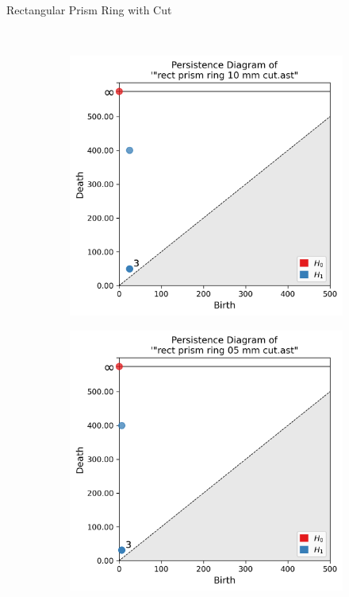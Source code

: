 \documentclass[xcolor=dvipsnames, aspectratio=169]{beamer}
\begin{document}
\begin{frame}{Rectangular Prism Ring with Cut}
\begin{figure}
\begin{subfigure}[b]{0.15\textwidth}
\end{subfigure}
\\[3pt]
\begin{subfigure}[b]{0.15\textwidth}
\includegraphics[width=\linewidth]{Final Run, (rect prism ring 10 mm cut) persdia.png}
\end{subfigure}
\begin{subfigure}[b]{0.15\textwidth}
\includegraphics[width=\linewidth]{Final Run, (rect prism ring 05 mm cut) persdia.png}

\end{subfigure}
\end{figure}
\end{frame}
\end{document}
